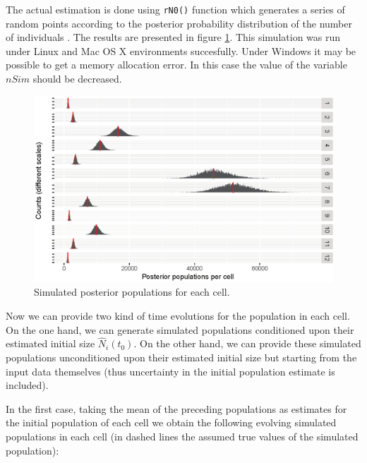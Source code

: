 \documentclass[12pt, a4paper]{article}
\begin{document}
The actual estimation is done using \texttt{rN0()} function which generates a series of random points according to the posterior probability distribution of the number of individuals . The results are presented in figure \ref{time1}. This simulation
was run under Linux and Mac OS X environments succesfully. Under Windows it may be possible to get a memory allocation error.
In this case the value of the variable $nSim$ should be decreased. 

\begin{figure}
\centering
\includegraphics[scale=0.85]{time1.eps}
\caption{Simulated posterior populations for each cell.}
\label{time1} 	
\end{figure}


Now we can provide two kind of time evolutions for the population in each cell. On the one hand, 
we can generate simulated populations conditioned upon their estimated initial size $\widehat{N}_{i}(t_{0})$. 
On the other hand, we can provide these simulated populations unconditioned upon their estimated 
initial size but starting from the input data themselves (thus uncertainty in the initial population estimate is included).

In the first case, taking the mean of the preceding populations as estimates for the initial population 
of each cell we obtain the following evolving simulated populations in each cell (in dashed lines the 
assumed true values of the simulated population):
\end{document}
